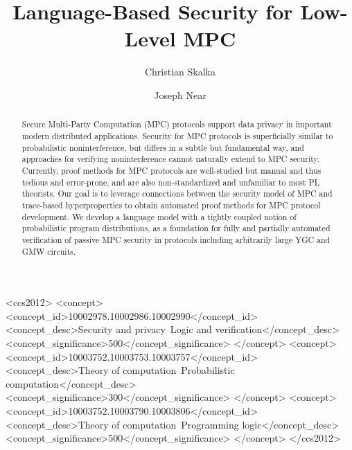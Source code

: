 \documentclass[sigconf]{acmart}
\begin{document}
\title{Language-Based Security for Low-Level MPC}

\author{Christian Skalka}

\author{Joseph Near}

\begin{abstract}
Secure Multi-Party Computation (MPC) protocols support data privacy in
important modern distributed applications. Security for MPC protocols
is superficially similar to probabilistic noninterference, but differs
in a subtle but fundamental way, and approaches for verifying
noninterference cannot naturally extend to MPC security.  Currently,
proof methods for MPC protocols are well-studied but manual and thus
tedious and error-prone, and are also non-standardized and unfamiliar
to most PL theorists.  Our goal is to leverage connections between the
security model of MPC and trace-based hyperproperties to obtain
automated proof methods for MPC protocol development.  We develop a
language model with a tightly coupled notion of probabilistic program
distributions, as a foundation for fully and partially automated
verification of passive MPC security in protocols including
arbitrarily large YGC and GMW circuits.
\end{abstract}

\begin{CCSXML}
<ccs2012>
   <concept>
       <concept_id>10002978.10002986.10002990</concept_id>
       <concept_desc>Security and privacy~Logic and verification</concept_desc>
       <concept_significance>500</concept_significance>
       </concept>
   <concept>
       <concept_id>10003752.10003753.10003757</concept_id>
       <concept_desc>Theory of computation~Probabilistic computation</concept_desc>
       <concept_significance>300</concept_significance>
       </concept>
   <concept>
       <concept_id>10003752.10003790.10003806</concept_id>
       <concept_desc>Theory of computation~Programming logic</concept_desc>
       <concept_significance>500</concept_significance>
       </concept>
 </ccs2012>
\end{CCSXML}

\end{document}
